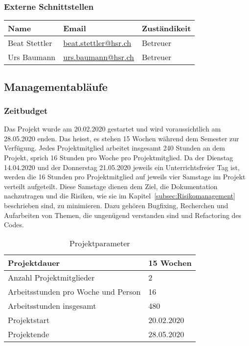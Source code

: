 \documentclass[]{subfiles}
\begin{document}
        \subsubsection{Externe Schnittstellen}
            \begin{tabularx}{0.9\textwidth}{lXl}
                \toprule
                Name & Email & Zuständikeit \\
                \midrule
                Beat Stettler & \url{beat.stettler@hsr.ch} & Betreuer \\
                Urs Baumann & \url{urs.baumann@hsr.ch} & Betreuer \\
                \bottomrule
            \end{tabularx}

    \subsection{Managementabläufe}

    \subsubsection{Zeitbudget}
		Das Projekt wurde am 20.02.2020 gestartet und wird voraussichtlich am 28.05.2020 enden.
		Das heisst, es stehen 15 Wochen während dem Semester zur Verfügung. 
        Jedes Projektmitglied arbeitet insgesamt 240 Stunden an dem Projekt, 
        sprich 16 Stunden pro Woche pro Projektmitglied.
        Da der Dienstag 14.04.2020 und der Donnerstag 21.05.2020 jeweils ein Unterrichtsfreier 
        Tag ist, werden die 16 Stunden pro Projektmitglied auf jeweils vier Samstage im Projekt 
        verteilt aufgeteilt.
        Diese Samstage dienen dem Ziel, die Dokumentation nachzutragen und die Risiken, 
        wie sie im Kapitel~\ref{subsec:Risikomanagement} beschrieben sind, zu minimieren. 
        Dazu gehören Bugfixing, Recherchen und Aufarbeiten von Themen, 
        die ungenügend verstanden sind und Refactoring des Codes.

		\begin{table}[!h]
			\begin{tabularx}{\textwidth}{Xl}
				\midrule
				Projektdauer & 15 Wochen \\
				\midrule
				Anzahl Projektmitglieder & 2 \\
				\midrule
				Arbeitsstunden pro Woche und Person & 16 \\
				\midrule
				Arbeitsstunden insgesamt & 480 \\
				\midrule
				Projektstart & 20.02.2020 \\
				\midrule
				Projektende & 28.05.2020 \\
				\midrule
			\end{tabularx}
			\caption{Projektparameter}
        \end{table}
        
\end{document}
